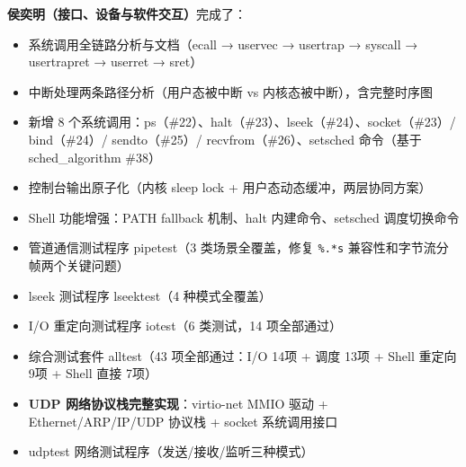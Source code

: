 \documentclass[12pt,a4paper]{ctexart}
\begin{document}
\textbf{侯奕明（接口、设备与软件交互）}完成了：
\begin{itemize}
  \item 系统调用全链路分析与文档（ecall → uservec → usertrap → syscall → usertrapret → userret → sret）
  \item 中断处理两条路径分析（用户态被中断 vs 内核态被中断），含完整时序图
  \item 新增 8 个系统调用：ps（\#22）、halt（\#23）、lseek（\#24）、socket（\#23）/ bind（\#24）/ sendto（\#25）/ recvfrom（\#26）、setsched 命令（基于 sched\_algorithm \#38）
  \item 控制台输出原子化（内核 sleep lock + 用户态动态缓冲，两层协同方案）
  \item Shell 功能增强：PATH fallback 机制、halt 内建命令、setsched 调度切换命令
  \item 管道通信测试程序 pipetest（3 类场景全覆盖，修复 \texttt{\%.*s} 兼容性和字节流分帧两个关键问题）
  \item lseek 测试程序 lseektest（4 种模式全覆盖）
  \item I/O 重定向测试程序 iotest（6 类测试，14 项全部通过）
  \item 综合测试套件 alltest（43 项全部通过：I/O 14项 + 调度 13项 + Shell 重定向 9项 + Shell 直接 7项）
  \item \textbf{UDP 网络协议栈完整实现}：virtio-net MMIO 驱动 + Ethernet/ARP/IP/UDP 协议栈 + socket 系统调用接口
  \item udptest 网络测试程序（发送/接收/监听三种模式）
\end{itemize}
\end{document}

